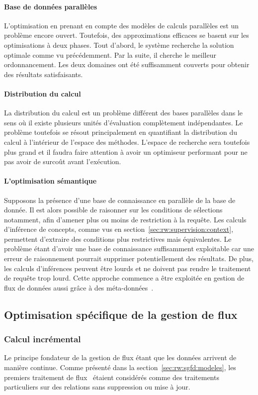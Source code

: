 \paragraph*{Base de données parallèles}
L'optimisation en prenant en compte des modèles de calculs parallèles est un problème encore ouvert. Toutefois, des approximations efficaces se basent sur les optimisations à deux phases. Tout d'abord, le système recherche la solution optimale comme vu précédemment. Par la suite, il cherche le meilleur ordonnancement. Les deux domaines ont été suffisamment couverts pour obtenir des résultats satisfaisants.

\paragraph*{Distribution du calcul}
La distribution du calcul est un problème différent des bases parallèles dans le sens où il existe plusieurs unités d'évaluation complètement indépendantes. Le problème toutefois se résout principalement en quantifiant la distribution du calcul à l'intérieur de l'espace des méthodes. L'espace de recherche sera toutefois plus grand et il faudra faire attention à avoir un optimiseur performant pour ne pas avoir de surcoût avant l'exécution.

\paragraph*{L'optimisation sémantique}
Supposons la présence d'une base de connaissance en parallèle de la base de donnée. Il est alors possible de raisonner sur les conditions de sélections notamment, afin d'amener plus ou moins de restriction à la requête. Les calculs d'inférence de concepts, comme vus en section~\ref{sec:rw:supervision:context}, permettent d'extraire des conditions plus restrictives mais équivalentes. Le problème étant d'avoir une base de connaissance suffisamment exploitable car une erreur de raisonnement pourrait supprimer potentiellement des résultats. De plus, les calculs d'inférences peuvent être lourds et ne doivent pas rendre le traitement de requête trop lourd. Cette approche commence a être exploitée en gestion de flux de données aussi grâce à des méta-données~\cite{Ding:semantic}.

\subsection{Optimisation spécifique de la gestion de flux}
\subsubsection{Calcul incrémental}
Le principe fondateur de la gestion de flux étant que les données arrivent de manière continue. Comme présenté dans la section~\ref{sec:rw:sgfd:modeles}, les premiers traitement de flux~\cite{Terry:tapestry} étaient considérés comme des traitements particuliers sur des relations sans suppression ou mise à jour.

